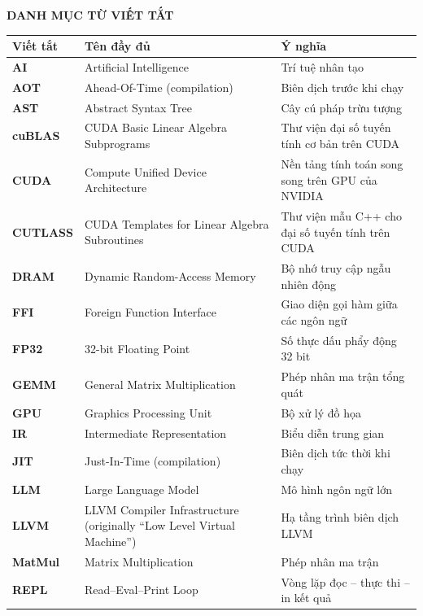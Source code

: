 \documentclass[a4paper]{article}
\begin{document}
    \vspace{10cm}
	\vspace{18pt}
	\begin{center}
		\textbf{DANH MỤC TỪ VIẾT TẮT}
	\end{center}
	\vspace{-6pt}
	\begin{center}
		\renewcommand{\arraystretch}{1.15}
		\begin{tabular}{>{\bfseries}l p{6.2cm} p{6.2cm}}
			\toprule
			\textbf{Viết tắt} & \textbf{Tên đầy đủ} & \textbf{Ý nghĩa} \\
			\midrule
			AI      & Artificial Intelligence & Trí tuệ nhân tạo \\
			AOT     & Ahead-Of-Time (compilation) & Biên dịch trước khi chạy \\
			AST     & Abstract Syntax Tree & Cây cú pháp trừu tượng \\
			cuBLAS  & CUDA Basic Linear Algebra Subprograms & Thư viện đại số tuyến tính cơ bản trên CUDA \\
			CUDA    & Compute Unified Device Architecture & Nền tảng tính toán song song trên GPU của NVIDIA \\
			CUTLASS & CUDA Templates for Linear Algebra Subroutines & Thư viện mẫu C++ cho đại số tuyến tính trên CUDA \\
			DRAM    & Dynamic Random-Access Memory & Bộ nhớ truy cập ngẫu nhiên động \\
			FFI     & Foreign Function Interface & Giao diện gọi hàm giữa các ngôn ngữ \\
			FP32    & 32-bit Floating Point & Số thực dấu phẩy động 32 bit \\
			GEMM    & General Matrix Multiplication & Phép nhân ma trận tổng quát \\
			GPU     & Graphics Processing Unit & Bộ xử lý đồ họa \\
			IR      & Intermediate Representation & Biểu diễn trung gian \\
			JIT     & Just-In-Time (compilation) & Biên dịch tức thời khi chạy \\
			LLM     & Large Language Model & Mô hình ngôn ngữ lớn \\
			LLVM    & LLVM Compiler Infrastructure (originally ``Low Level Virtual Machine'') & Hạ tầng trình biên dịch LLVM \\
			MatMul  & Matrix Multiplication & Phép nhân ma trận \\
			REPL    & Read--Eval--Print Loop & Vòng lặp đọc -- thực thi -- in kết quả \\
			\bottomrule
		\end{tabular}
	\end{center}
	
\end{document}
